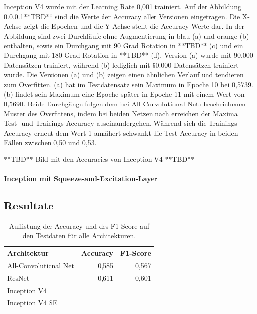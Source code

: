 Inception V4 wurde mit der Learning Rate 0,001 trainiert. Auf der Abbildung \ref{}**TBD** sind die Werte der Accuracy aller Versionen eingetragen. Die X-Achse zeigt die Epochen und die Y-Achse stellt die Accuracy-Werte dar. In der Abbildung sind zwei Durchläufe ohne Augmentierung in blau (a) und orange (b) enthalten, sowie ein Durchgang mit 90 Grad Rotation in **TBD** (c) und ein Durchgang mit 180 Grad Rotation in **TBD** (d). Version (a) wurde mit 90.000 Datensätzen trainiert, während (b) lediglich mit 60.000 Datensätzen trainiert wurde. 
Die Versionen (a) und (b) zeigen einen ähnlichen Verlauf und tendieren zum Overfitten. (a) hat im Testdatensatz sein Maximum in Epoche 10 bei 0,5739. (b) findet sein Maximum eine Epoche später in Epoche 11 mit einem Wert von 0,5690. Beide Durchgänge folgen dem bei All-Convolutional Nets beschriebenen Muster des Overfittens, indem bei beiden Netzen nach erreichen der Maxima Test- und Trainings-Accuracy auseinandergehen. Während sich die Trainings-Accuracy erneut dem Wert 1 annähert schwankt die Test-Accuracy in beiden Fällen zwischen 0,50 und 0,53.

**TBD**
Bild mit den Accuracies von Inception V4
**TBD**
 
\paragraph{Inception mit Squeeze-and-Excitation-Layer}

\subsection{Resultate}
\label{Resultate}

\begin{table}
\centering
\caption{Auflistung der Accuracy und des F1-Score auf den Testdaten für alle Architekturen.}
\begin{tabular}{@{}lrr@{}}
\hline
Architektur & Accuracy & F1-Score\\
\hline
All-Convolutional Net & 0,585 & 0,567\\
ResNet & 0,611 & 0,601\\
Inception V4 & & \\
Inception V4 SE & & \\
\hline
\end{tabular}
\label{tb:resnet}
\end{table}